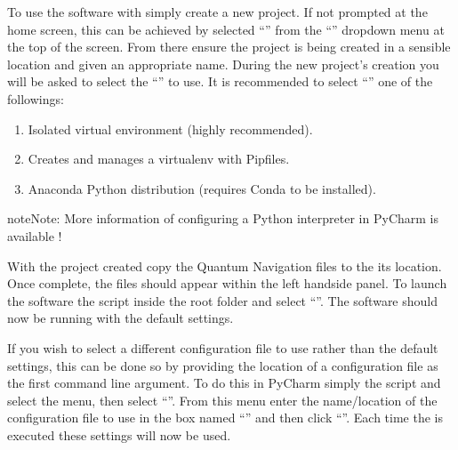 \documentclass[letterpaper,10pt,english]{sphinxmanual}
\begin{document}
\sphinxAtStartPar
To use the software with  simply create a new
project. If not prompted at the home screen, this can be achieved by selected “” from the
“” dropdown menu at the top of the screen. From there ensure the project is being created in a sensible
location and given an appropriate name. During the new project’s creation you will be asked to select the
“” to use. It is recommended to select “” one of the followings:
\begin{enumerate}
%
\item {} 
\sphinxAtStartPar
{} \sphinxhyphen{} Isolated virtual environment (highly recommended).

\item {} 
\sphinxAtStartPar
{} \sphinxhyphen{} Creates and manages a virtualenv with Pipfiles.

\item {} 
\sphinxAtStartPar
{} \sphinxhyphen{} Anaconda Python distribution (requires Conda to be installed).

\end{enumerate}

\begin{sphinxadmonition}{note}{Note:}
\sphinxAtStartPar
More information of configuring a Python interpreter in PyCharm is available
!
\end{sphinxadmonition}

\sphinxAtStartPar
With the project created copy the Quantum Navigation files to the its location. Once complete, the files should
appear within the left hand\sphinxhyphen{}side panel. To launch the software  the script 
inside the root folder and select “”. The software should now be running with
the default settings.

\sphinxAtStartPar
If you wish to select a different configuration file to use rather than the default settings, this can be done so by
providing the location of a configuration file as the first command line argument. To do this in PyCharm simply
 the script and select the  menu, then select “”.
From this menu enter the name/location of the configuration file to use in the box named “” and
then click “”. Each time the  is executed these settings will now be used.
\end{document}
